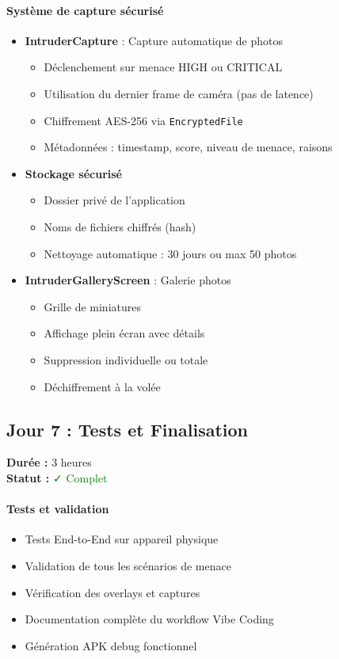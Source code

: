\documentclass[11pt,a4paper]{article}
\begin{document}
\paragraph{Système de capture sécurisé}
\begin{itemize}
    \item \textbf{IntruderCapture} : Capture automatique de photos
    \begin{itemize}
        \item Déclenchement sur menace HIGH ou CRITICAL
        \item Utilisation du dernier frame de caméra (pas de latence)
        \item Chiffrement AES-256 via \texttt{EncryptedFile}
        \item Métadonnées : timestamp, score, niveau de menace, raisons
    \end{itemize}
    \item \textbf{Stockage sécurisé}
    \begin{itemize}
        \item Dossier privé de l'application
        \item Noms de fichiers chiffrés (hash)
        \item Nettoyage automatique : 30 jours ou max 50 photos
    \end{itemize}
    \item \textbf{IntruderGalleryScreen} : Galerie photos
    \begin{itemize}
        \item Grille de miniatures
        \item Affichage plein écran avec détails
        \item Suppression individuelle ou totale
        \item Déchiffrement à la volée
    \end{itemize}
\end{itemize}

\subsection{Jour 7 : Tests et Finalisation}

\textbf{Durée :} 3 heures \\
\textbf{Statut :} \textcolor{green}{✓ Complet}

\paragraph{Tests et validation}
\begin{itemize}
    \item Tests End-to-End sur appareil physique
    \item Validation de tous les scénarios de menace
    \item Vérification des overlays et captures
    \item Documentation complète du workflow Vibe Coding
    \item Génération APK debug fonctionnel
\end{itemize}
\end{document}

